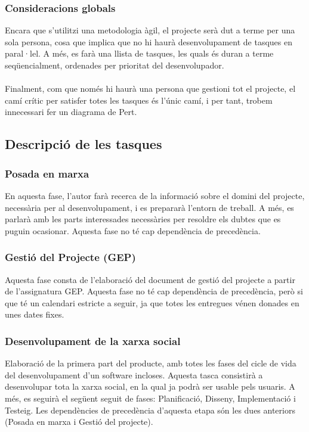 \documentclass[11pt,catalan,listoffigures,listoftables]{tfgetsinf}
\begin{document}
\subsubsection{Consideracions globals}

Encara que s'utilitzi una metodologia àgil, el projecte serà dut a terme per una sola persona, cosa que implica que no hi haurà desenvolupament de tasques en paral·lel. A més, es farà una llista de tasques, les quals és duran a terme seqüencialment, ordenades per prioritat del desenvolupador.\\ \\
Finalment, com que només hi haurà una persona que gestioni tot el projecte, el camí crític per satisfer totes les tasques és l’únic camí,  i per tant, trobem innecessari fer un diagrama de Pert.

\subsection{Descripció de les tasques}

\subsubsection{Posada en marxa}
En aquesta fase, l’autor farà recerca de la informació sobre el domini del projecte, necessària per al desenvolupament, i es prepararà l’entorn de treball. A més, es parlarà amb les parts interessades necessàries per resoldre els dubtes que es puguin ocasionar. Aquesta fase no té cap dependència de precedència.
	
\subsubsection{Gestió del Projecte (GEP)}
Aquesta fase consta de l’elaboració del document de gestió del projecte a partir de l’assignatura GEP. Aquesta fase no té cap dependència de precedència, però si que té un calendari estricte a seguir, ja que totes les entregues vénen donades en unes dates fixes.

\subsubsection{Desenvolupament de la xarxa social}
Elaboració de la primera part del producte, amb totes les fases del cicle de vida del desenvolupament d’un software incloses.  Aquesta tasca consistirà a desenvolupar tota la xarxa social, en la qual ja podrà ser usable pels usuaris. A més, es seguirà el següent seguit de fases: Planificació, Disseny, Implementació i Testeig. Les dependències de precedència d’aquesta etapa són les dues anteriors (Posada en marxa i Gestió del projecte).
\end{document}
